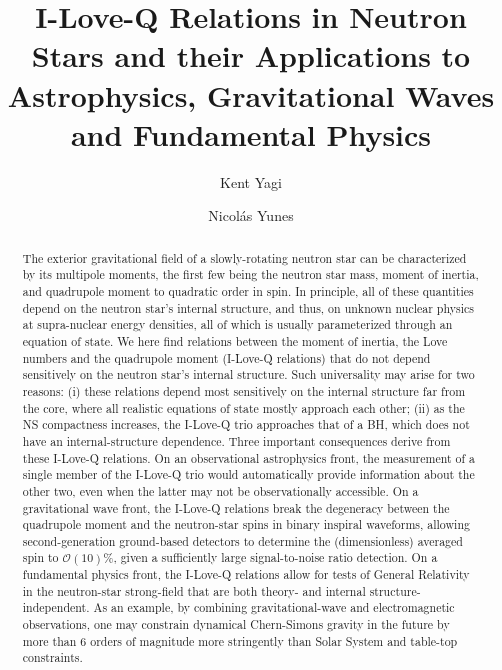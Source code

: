 \documentclass[aps,twocolumn,nofootinbib,showpacs,superscriptaddress,hyperref]{revtex4-1}
\begin{document}
\title{I-Love-Q Relations in Neutron Stars and their Applications to \\ Astrophysics, Gravitational Waves and Fundamental Physics}    

\author{Kent Yagi}

\author{Nicol\'as Yunes}


\begin{abstract} 

The exterior gravitational field of a slowly-rotating neutron star can be characterized by its multipole moments, the first few being the neutron star mass, moment of inertia, and quadrupole moment to quadratic order in spin.
%
In principle, all of these quantities depend on the neutron star's internal structure, and thus, on unknown nuclear physics at supra-nuclear energy densities, all of which is usually parameterized through an equation of state. 
%
We here find relations between the moment of inertia, the Love numbers and the quadrupole moment (I-Love-Q relations) that do not depend sensitively on the neutron star's internal structure.
%
Such universality may arise for two reasons: (i) these relations depend most sensitively on the internal structure far from the core, where all realistic equations of state mostly approach each other; (ii) as the NS compactness increases, the I-Love-Q trio approaches that of a BH, which does not have an internal-structure dependence. 
%
Three important consequences derive from these I-Love-Q relations.
%
On an observational astrophysics front, the measurement of a single member of the I-Love-Q trio would automatically provide information about the other two, even when the latter may not be observationally accessible. 
%
On a gravitational wave front, the I-Love-Q relations break the degeneracy between the quadrupole moment and the neutron-star spins in binary inspiral waveforms, allowing second-generation ground-based detectors to determine the (dimensionless) averaged spin to $\mathcal{O}(10)\%$, given a sufficiently large signal-to-noise ratio detection. 
%
On a fundamental physics front, the I-Love-Q relations allow for tests of General Relativity in the neutron-star strong-field that are both theory- and internal structure-independent. As an example, by combining gravitational-wave and electromagnetic observations, one may constrain dynamical Chern-Simons gravity in the future by more than 6 orders of magnitude more stringently than Solar System and table-top constraints.
\end{abstract}
\end{document}
